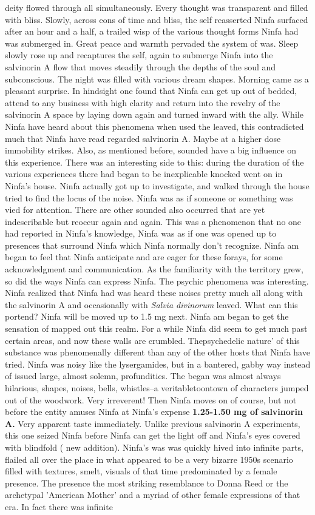 \documentclass[12pt]{book}
\begin{document}
deity flowed through all simultaneously. Every thought was transparent and filled with bliss. Slowly, across eons of time and bliss, the self reasserted Ninfa surfaced after an hour and a half, a trailed wisp of the various thought forms Ninfa had was submerged in. Great peace and warmth pervaded the system of was. Sleep slowly rose up and recaptures the self, again to submerge Ninfa into the salvinorin A flow that moves steadily through the depths of the soul and subconscious. The night was filled with various dream shapes. Morning came as a pleasant surprise. In hindsight one found that Ninfa can get up out of bedded, attend to any business with high clarity and return into the revelry of the salvinorin A space by laying down again and turned inward with the ally. While Ninfa have heard about this phenomena when used the leaved, this contradicted much that Ninfa have read regarded salvinorin A. Maybe at a higher dose immobility strikes. Also, as mentioned before, sounded have a big influence on this experience. There was an interesting side to this: during the duration of the various experiences there had began to be inexplicable knocked went on in Ninfa's house. Ninfa actually got up to investigate, and walked through the house tried to find the locus of the noise. Ninfa was as if someone or something was vied for attention. There are other sounded also occurred that are yet indescribable but reoccur again and again. This was a phenomenon that no one had reported in Ninfa's knowledge, Ninfa was as if one was opened up to presences that surround Ninfa which Ninfa normally don't recognize. Ninfa am began to feel that Ninfa anticipate and are eager for these forays, for some acknowledgment and communication. As the familiarity with the territory grew, so did the ways Ninfa can express Ninfa. The psychic phenomena was interesting. Ninfa realized that Ninfa had was heard these noises pretty much all along with the salvinorin A and occasionally with \emph{Salvia divinorum} leaved. What can this portend? Ninfa will be moved up to 1.5 mg next. Ninfa am began to get the sensation of mapped out this realm. For a while Ninfa did seem to get much past certain areas, and now these walls are crumbled. Thepsychedelic nature' of this substance was phenomenally different than any of the other hosts that Ninfa have tried. Ninfa was noisy like the lysergamides, but in a bantered, gabby way instead of issued large, almost solemn, profundities. The began was almost always hilarious, shapes, noises, bells, whistles--a veritabletoontown of characters jumped out of the woodwork. Very irreverent! Then Ninfa moves on of course, but not before the entity amuses Ninfa at Ninfa's expense \textbf{1.25-1.50 mg of salvinorin A.} Very apparent taste immediately. Unlike previous salvinorin A experiments, this one seized Ninfa before Ninfa can get the light off and Ninfa's eyes covered with blindfold ( new addition). Ninfa's was was quickly hived into infinite parts, flailed all over the place in what appeared to be a very bizarre 1950s scenario filled with textures, smelt, visuals of that time predominated by a female presence. The presence  the most striking resemblance to Donna Reed or the archetypal 'American Mother' and a myriad of other female expressions of that era. In fact there was infinite 
\end{document}
